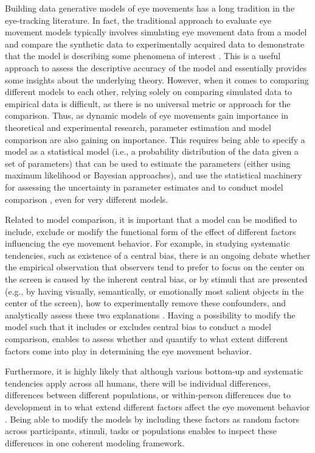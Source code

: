 \documentclass{article}
\begin{document}
Building data generative models of eye movements has a long tradition in the eye-tracking literature. In fact, the traditional approach to evaluate eye movement models typically involves simulating eye movement data from a model and compare the synthetic data to experimentally acquired data to demonstrate that the model is describing some phenomena of interest \citep{schutt2017likelihood}. This is a useful approach to assess the descriptive accuracy of the model and essentially provides some insights about the underlying theory. However, when it comes to comparing different models to each other, relying solely on comparing simulated data to empirical data is difficult, as there is no universal metric or approach for the comparison. Thus, as dynamic models of eye movements gain importance in theoretical and experimental research, parameter estimation and model comparison are also gaining on importance. This requires being able to specify a model as a statistical model (i.e., a probability distribution of the data given a set of parameters) that can be used to estimate the parameters (either using maximum likelihood or Bayesian approaches), and use the statistical machinery for assessing the uncertainty in parameter estimates and to conduct model comparison \citep{schutt2017likelihood,malem2020exploration}, even for very different models.

Related to model comparison, it is important that a model can be modified to include, exclude or modify the functional form of the effect of different factors influencing the eye movement behavior. For example, in studying systematic tendencies, such as existence of a central bias, there is an ongoing debate whether the empirical observation that observers tend to prefer to focus on the center on the screen is caused by the inherent central bias, or by stimuli that are presented (e.g., by having visually, semantically, or emotionally most salient objects in the center of the screen), how to experimentally remove these confounders, and analytically assess these two explanations \citep{tatler2007central,renswoude2019central,tseng2009quantifying}. Having a possibility to modify the model such that it includes or excludes central bias to conduct a model comparison, enables to assess whether and quantify to what extent different factors come into play in determining the eye movement behavior. 

Furthermore, it is highly likely that although various bottom-up and systematic tendencies apply across all humans, there will be individual differences, differences between different populations, or within-person differences due to development in to what extend different factors affect the eye movement behavior \citep{de2019individual}. Being able to modify the models by including these factors as random factors across participants, stimuli, tasks or populations enables to inspect these differences in one coherent modeling framework.
\end{document}
